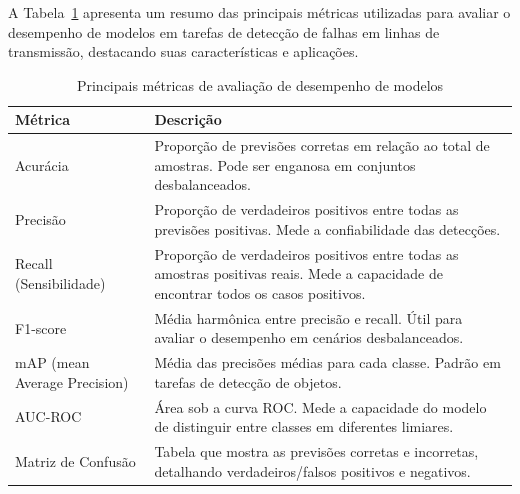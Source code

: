 A Tabela~\ref{tab:metricas_avaliacao_modelos} apresenta um resumo das principais métricas utilizadas para avaliar o desempenho de modelos em tarefas de detecção de falhas em linhas de transmissão, destacando suas características e aplicações.

\begin{table}[H]
\centering
\caption{Principais métricas de avaliação de desempenho de modelos}
\label{tab:metricas_avaliacao_modelos}
\begin{tabular}{|p{4.5cm}|p{10cm}|}
\hline
\textbf{Métrica} & \textbf{Descrição} \\
\hline
Acurácia & Proporção de previsões corretas em relação ao total de amostras. Pode ser enganosa em conjuntos desbalanceados. \\
\hline
Precisão & Proporção de verdadeiros positivos entre todas as previsões positivas. Mede a confiabilidade das detecções. \\
\hline
Recall (Sensibilidade) & Proporção de verdadeiros positivos entre todas as amostras positivas reais. Mede a capacidade de encontrar todos os casos positivos. \\
\hline
F1-score & Média harmônica entre precisão e recall. Útil para avaliar o desempenho em cenários desbalanceados. \\
\hline
mAP (mean Average Precision) & Média das precisões médias para cada classe. Padrão em tarefas de detecção de objetos. \\
\hline
AUC-ROC & Área sob a curva ROC. Mede a capacidade do modelo de distinguir entre classes em diferentes limiares. \\
\hline
Matriz de Confusão & Tabela que mostra as previsões corretas e incorretas, detalhando verdadeiros/falsos positivos e negativos. \\
\hline
\end{tabular}
\end{table}
